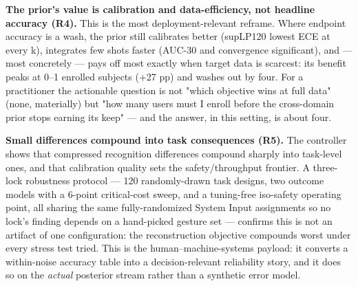 \textbf{The prior's value is calibration and data-efficiency, not headline accuracy (R4).} This is the most deployment-relevant reframe. Where endpoint accuracy is a wash, the prior still calibrates better (supLP120 lowest ECE at every k), integrates few shots faster (AUC-30 and convergence significant), and --- most concretely --- pays off most exactly when target data is scarcest: its benefit peaks at 0--1 enrolled subjects (+27 pp) and washes out by four. For a practitioner the actionable question is not "which objective wins at full data" (none, materially) but "how many users must I enroll before the cross-domain prior stops earning its keep" --- and the answer, in this setting, is about four.

\textbf{Small differences compound into task consequences (R5).} The controller shows that compressed recognition differences compound sharply into task-level ones, and that calibration quality sets the safety/throughput frontier. A three-lock robustness protocol --- 120 randomly-drawn task designs, two outcome models with a 6-point critical-cost sweep, and a tuning-free iso-safety operating point, all sharing the same fully-randomized System Input assignments so no lock's finding depends on a hand-picked gesture set --- confirms this is not an artifact of one configuration: the reconstruction objective compounds worst under every stress test tried. This is the human--machine-systems payload: it converts a within-noise accuracy table into a decision-relevant reliability story, and it does so on the \textit{actual} posterior stream rather than a synthetic error model.

